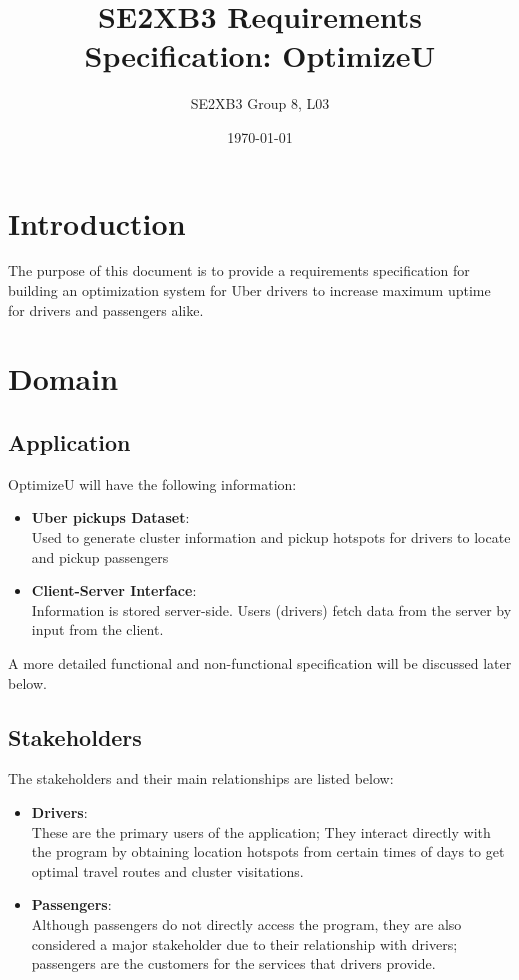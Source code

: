 \documentclass[12pt]{article}
\title{SE2XB3 Requirements Specification: OptimizeU}
\author{SE2XB3 Group 8, L03}
\date{\today}
\begin{document}
\maketitle
\tableofcontents

\newpage
\section{Introduction}
The purpose of this document is to provide a requirements specification for
building an optimization system for Uber drivers to increase maximum uptime
for drivers and passengers alike.
\section{Domain}
\subsection{Application}
OptimizeU will have the following information:
\begin{itemize}
	\item \textbf{Uber pickups Dataset}:\\
	       Used to generate cluster information and pickup hotspots for
	       drivers to locate and pickup passengers
	\item \textbf{Client-Server Interface}:\\
	       Information is stored server-side. Users (drivers) fetch data
	       from the server by input from the client.
\end{itemize} 
A more detailed functional and non-functional specification will be 
discussed later below.
\subsection{Stakeholders}
The stakeholders and their main relationships are listed below:
\begin{itemize}
	\item \textbf{Drivers}:\\
		These are the primary users of the application; They interact 
		directly with the program by obtaining location hotspots from
		certain times of days to get optimal travel routes and cluster
		visitations. 
	\item \textbf{Passengers}:\\
		Although passengers do not directly access the program, they
		are also considered a major stakeholder due to their relationship
		with drivers; passengers are the customers for the services that
		drivers provide.
\end{itemize}
\end{document}
